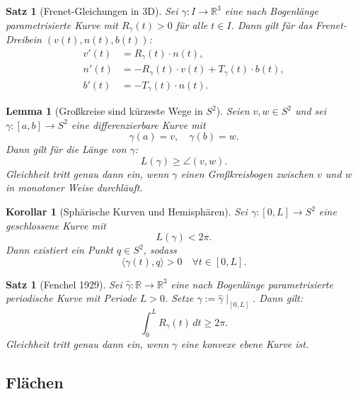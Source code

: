 \documentclass[a4paper,12pt]{article}
\theoremstyle{break}
\newtheorem{theorem}[definition]{Satz}
\newtheorem{lemma}[definition]{Lemma}
\newtheorem{corollary}[definition]{Korollar}
\begin{document}
\begin{theorem}[Frenet-Gleichungen in 3D]
Sei \( \gamma: I \to \mathbb{R}^3 \) eine nach Bogenlänge parametrisierte Kurve mit \( R_{\gamma}(t) > 0 \) für alle \( t \in I \).  
Dann gilt für das Frenet-Dreibein \( (v(t), n(t), b(t)) \):  
\[
\begin{aligned}
    v'(t) &= R_{\gamma}(t) \cdot n(t), \\
    n'(t) &= -R_{\gamma}(t) \cdot v(t) + T_{\gamma}(t) \cdot b(t), \\
    b'(t) &= -T_{\gamma}(t) \cdot n(t).
\end{aligned}
\]
\end{theorem}

\begin{lemma}[Großkreise sind kürzeste Wege in \( S^2 \)]
Seien \( v, w \in S^2 \) und sei \( \gamma: [a,b] \to S^2 \) eine differenzierbare Kurve mit  
\[
\gamma(a) = v, \quad \gamma(b) = w.
\]
Dann gilt für die Länge von \( \gamma \):  
\[
L(\gamma) \geq \angle(v,w).
\]
Gleichheit tritt genau dann ein, wenn \( \gamma \) einen Großkreisbogen zwischen \( v \) und \( w \) in monotoner Weise durchläuft.
\end{lemma}

\begin{corollary}[Sphärische Kurven und Hemisphären]
Sei \( \gamma: [0,L] \to S^2 \) eine geschlossene Kurve mit  
\[
L(\gamma) < 2\pi.
\]
Dann existiert ein Punkt \( q \in S^2 \), sodass  
\[
\langle \gamma(t), q \rangle > 0 \quad \forall t \in [0,L].
\]
\end{corollary}

\begin{theorem}[Fenchel 1929]
Sei \( \hat{\gamma}: \mathbb{R} \to \mathbb{R}^3 \) eine nach Bogenlänge parametrisierte periodische Kurve mit Periode \( L > 0 \).  
Setze \( \gamma := \hat{\gamma} \mid_{[0,L]} \). Dann gilt:  
\[
\int_0^L R_{\gamma}(t) \, dt \geq 2\pi.
\]
Gleichheit tritt genau dann ein, wenn \( \gamma \) eine konvexe ebene Kurve ist.
\end{theorem}

\subsection{Flächen}
\end{document}
